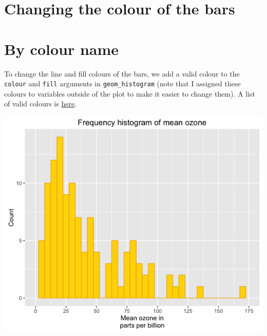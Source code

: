 \section{Changing the colour of the
bars}\label{changing-the-colour-of-the-bars}

\section{By colour name}\label{by-colour-name}

To change the line and fill colours of the bars, we add a valid colour
to the \texttt{colour} and \texttt{fill} arguments in
\texttt{geom\_histogram} (note that I assigned these colours to
variables outside of the plot to make it easier to change them). A list
of valid colours is
\href{http://www.stat.columbia.edu/~tzheng/files/Rcolor.pdf}{here}.

\begin{Shaded}
\begin{Highlighting}[]

\StringTok{ }\NormalTok{(} \StringTok{ }
\StringTok{      }\NormalTok{(}\NormalTok{(}  \NormalTok{,}
\StringTok{        }  
\StringTok{      }\NormalTok{(} \NormalTok{,}
\StringTok{        } \NormalTok{(}\NormalTok{, }\NormalTok{, }\NormalTok{),}
\StringTok{        }\NormalTok{(}\NormalTok{, }\NormalTok{)) +}
\StringTok{      }\NormalTok{(} \NormalTok{) +}
\StringTok{      }\NormalTok{(}\NormalTok{)}
\end{Highlighting}
\end{Shaded}

\begin{center}\includegraphics[width=0.55\linewidth]{0_all_posts_pdf/histogram_9-1} \end{center}

